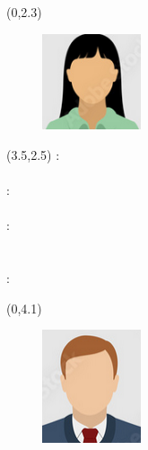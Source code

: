 \documentclass[14pt,a4paper]{report}  %
\begin{document}
   \vspace{2em}
	{\begin{textblock}{6}(0,2.3)
	\begin{figure}
	\includegraphics[width=1.15in]{member2}  %
    \end{figure}
    \end{textblock}}
    {\renewcommand\baselinestretch{0.99}
    \selectfont %
    {\begin{textblock}{15}(3.5,2.5) %
\noindent\fontsize{14pt}{0em}\selectfont {}\enspace:\enspace
\fontsize{14pt}{0em}\selectfont {}\\ 
\hspace*{\fill} \\
\fontsize{14pt}{0em}\selectfont {}\enspace:\enspace
\noindent\fontsize{14pt}{0em}\selectfont {} \\ 
\hspace*{\fill} \\
\fontsize{14pt}{0em}\selectfont {}\enspace:\enspace
\fontsize{14pt}{0em}\selectfont {}\\
\fontsize{14pt}{0em}\selectfont \makebox[5em][s]{\quad}\enspace\enspace
\fontsize{14pt}{0em}\selectfont {}\\
\hspace*{\fill} \\
\fontsize{14pt}{0em}\selectfont {}\enspace:\enspace
    \end{textblock}}}
    \vspace{2em}
    {\begin{textblock}{6}(0,4.1)
    \begin{figure}
        \includegraphics[width=1.15in]{member3} %
    \end{figure}
    \end{textblock}}
\end{document}
